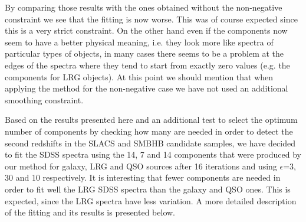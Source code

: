 \documentclass[12pt,preprint]{aastex}
\begin{document}
By comparing those results with the ones obtained without the
non-negative constraint we see that the fitting is now worse. This was
of course expected since this is a very strict constraint. On the
other hand even if the components now seem to have a better physical
meaning, i.e. they look more like spectra of particular types of
objects, in many cases there seems to be a problem at the edges of the
spectra where they tend to start from exactly zero values (e.g. the
components for LRG objects). At this point we should mention that when
applying the method for the non-negative case we have not used an
additional smoothing constraint.

Based on the results presented here and an additional test to select
the optimum number of components by checking how many are needed in
order to detect the second redshifts in the SLACS and SMBHB candidate
samples, we have decided to fit the SDSS spectra using the 14, 7 and
14 components that were produced by our method for galaxy, LRG and QSO
sources after 16 iterations and using $\epsilon$=3, 30 and 10
respectively. It is interesting that fewer components are needed in
order to fit well the LRG SDSS spectra than the galaxy and QSO
ones. This is expected, since the LRG spectra have less variation. A
more detailed description of the fitting and its results is presented
below.
\end{document}
